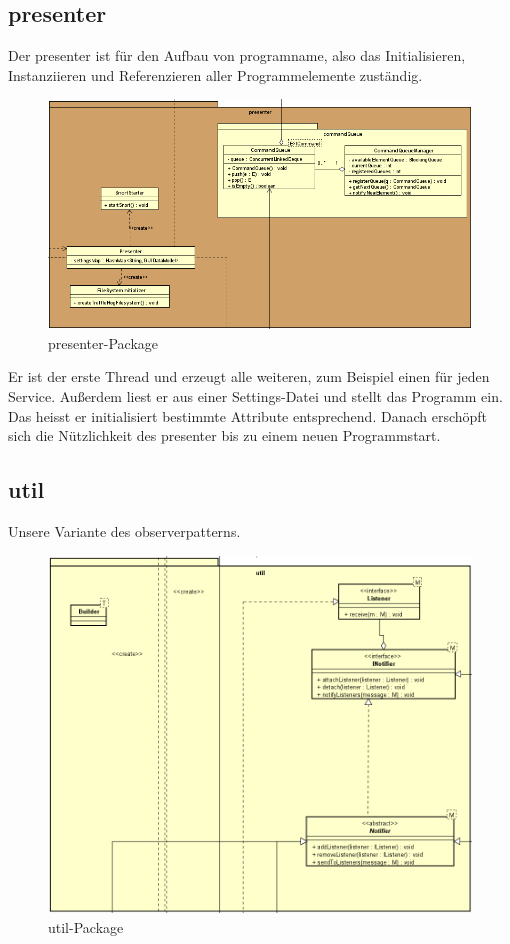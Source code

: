 \subsection{presenter}


Der presenter ist für den Aufbau von \gls{programname}, also das
Initialisieren, Instanziieren und Referenzieren aller Programmelemente zuständig.

\begin{figure}[H]
  \centering
  \includegraphics[width=\textwidth]{../diagramimages/presenter.png}
  \caption{presenter-Package}
\end{figure}

Er ist der erste Thread und erzeugt alle weiteren, zum Beispiel einen für jeden
Service. Außerdem liest er aus einer Settings-Datei und stellt das Programm ein.
Das heisst er initialisiert bestimmte Attribute entsprechend. Danach erschöpft
sich die Nützlichkeit des presenter bis zu einem neuen Programmstart.


\subsection{util}
\label{subsec:util}


Unsere Variante des \gls{observerpattern}s.

\begin{figure}[H]
  \centering
  \includegraphics[width=\textwidth]{../diagramimages/util.png}
  \caption{util-Package}
\end{figure}

